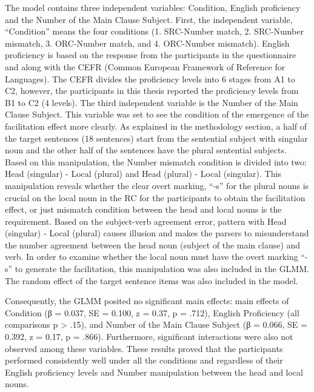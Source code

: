 \documentclass[
]{article}
\begin{document}
The model contains three independent variables: Condition, English
proficiency and the Number of the Main Clause Subject. First, the
independent variable, ``Condition'' means the four conditions (1.
SRC-Number match, 2. SRC-Number mismatch, 3. ORC-Number match, and 4.
ORC-Number mismatch). English proficiency is based on the response from
the participants in the questionnaire and along with the CEFR (Common
European Framework of Reference for Languages). The CEFR divides the
proficiency levels into 6 stages from A1 to C2, however, the
participants in this thesis reported the proficiency levels from B1 to
C2 (4 levels). The third independent variable is the Number of the Main
Clause Subject. This variable was set to see the condition of the
emergence of the facilitation effect more clearly. As explained in the
methodology section, a half of the target sentences (18 sentences) start
from the sentential subject with singular noun and the other half of the
sentences have the plural sentential subjects. Based on this
manipulation, the Number mismatch condition is divided into two: Head
(singular) - Local (plural) and Head (plural) - Local (singular). This
manipulation reveals whether the clear overt marking, ``-s'' for the
plural nouns is crucial on the local noun in the RC for the participants
to obtain the facilitation effect, or just mismatch condition between
the head and local nouns is the requirement. Based on the subject-verb
agreement error, pattern with Head (singular) - Local (plural) causes
illusion and makes the parsers to misunderstand the number agreement
between the head noun (subject of the main clause) and verb. In order to
examine whether the local noun must have the overt marking ``-s'' to
generate the facilitation, this manipulation was also included in the
GLMM. The random effect of the target sentence items was also included
in the model.

Consequently, the GLMM posited no significant main effects: main effects
of Condition (β = 0.037, SE = 0.100, z = 0.37, p = .712), English
Proficiency (all comparisons p \textgreater{} .15), and Number of the
Main Clause Subject (β = 0.066, SE = 0.392, z = 0.17, p = .866).
Furthermore, significant interactions were also not observed among these
variables. These results proved that the participants performed
consistently well under all the conditions and regardless of their
English proficiency levels and Number manipulation between the head and
local nouns.
\end{document}
